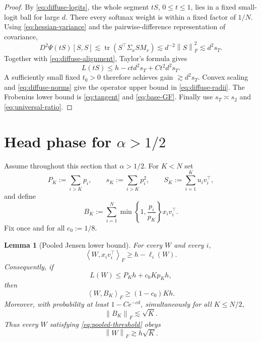 \documentclass[11pt]{article}
\newtheorem{lemma}[lemma]{Lemma}
\theoremstyle{definition}
\newcommand{\tr}{\operatorname{tr}}
\newcommand{\ip}[2]{\left\langle #1,#2\right\rangle_F}
\newcommand{\normF}[1]{\left\lVert #1\right\rVert_F}
\begin{document}
\begin{proof}
By \eqref{eq:diffuse-logits}, the whole segment $tS$, $0\leq t\leq1$,
lies in a fixed small-logit ball for large $d$.  There every softmax
weight is within a fixed factor of $1/N$.  Using
\eqref{eq:hessian-variance} and the pairwise-difference representation
of covariance,
\[
 D^2\Psi(tS)[S,S]
 \lesssim \tr(S^\top\Sigma_x S M_v)
 \lesssim d^{-2}\normF{S}^2
 \lesssim d^2s_T.
\]
Together with \eqref{eq:diffuse-alignment}, Taylor's formula gives
\[
 L(tS)\leq h-c t d^2s_T+C t^2d^2s_T.
\]
A sufficiently small fixed $t_0>0$ therefore achieves gain
$\gtrsim d^2s_T$.  Convex scaling and \eqref{eq:diffuse-norms} give the
operator upper bound in \eqref{eq:diffuse-radii}.  The Frobenius lower
bound is \eqref{eq:tangent} and \eqref{eq:base-GF}.  Finally use
$s_T\asymp s_2$ and \eqref{eq:universal-ratio}.
\end{proof}

\section{Head phase for \texorpdfstring{$\alpha>1/2$}{alpha > 1/2}}

Assume throughout this section that $\alpha>1/2$.  For $K<N$ set
\[
 P_K:=\sum_{i>K}p_i,
 \qquad s_K:=\sum_{i>K}p_i^2,
 \qquad S_K:=\sum_{i=1}^K u_iv_i^\top,
\]
and define
\begin{equation}
 B_K:=\sum_{i=1}^N
 \min\left\{1,\frac{p_i}{p_K}\right\}x_iv_i^\top.
 \label{eq:BK-def}
\end{equation}
Fix once and for all $c_0:=1/8$.

\begin{lemma}[Pooled Jensen lower bound]
\label{lem:pooled}
For every $W$ and every $i$,
\begin{equation}
 \ip{W}{x_iv_i^\top}\geq h-\ell_i(W).
 \label{eq:single-pooled}
\end{equation}
Consequently, if
\begin{equation}
 L(W)\leq P_Kh+c_0Kp_Kh,
 \label{eq:pooled-threshold}
\end{equation}
then
\begin{equation}
 \ip{W}{B_K}\geq(1-c_0)Kh.
 \label{eq:BK-alignment}
\end{equation}
Moreover, with probability at least $1-Ce^{-cd}$, simultaneously for
all $K\leq N/2$,
\begin{equation}
 \normF{B_K}\lesssim\sqrt K.
 \label{eq:BK-norm}
\end{equation}
Thus every $W$ satisfying \eqref{eq:pooled-threshold} obeys
\begin{equation}
 \normF{W}\gtrsim h\sqrt K.
 \label{eq:head-F-lower}
\end{equation}
\end{lemma}
\end{document}
